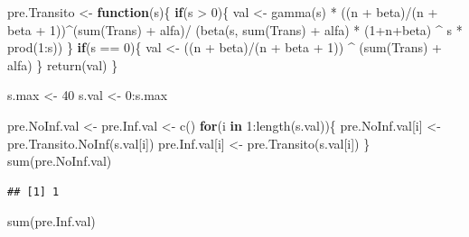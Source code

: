 \documentclass[
  10pt,
  spanish,
]{book}
\newenvironment{Shaded}{\begin{snugshade}}{\end{snugshade}}
\newcommand{\ControlFlowTok}[1]{\textcolor[rgb]{0.13,0.29,0.53}{\textbf{#1}}}
\newcommand{\DecValTok}[1]{\textcolor[rgb]{0.00,0.00,0.81}{#1}}
\newcommand{\FunctionTok}[1]{\textcolor[rgb]{0.00,0.00,0.00}{#1}}
\newcommand{\NormalTok}[1]{#1}
\newcommand{\OtherTok}[1]{\textcolor[rgb]{0.56,0.35,0.01}{#1}}
\newcommand{\SpecialCharTok}[1]{\textcolor[rgb]{0.00,0.00,0.00}{#1}}
\theoremstyle{definition}
\theoremstyle{definition}
\theoremstyle{definition}
\theoremstyle{definition}
\theoremstyle{remark}
\begin{document}
\begin{Shaded}
\begin{Highlighting}[]
\NormalTok{pre.Transito }\OtherTok{\textless{}{-}} \ControlFlowTok{function}\NormalTok{(s)\{}
  \ControlFlowTok{if}\NormalTok{(s }\SpecialCharTok{\textgreater{}} \DecValTok{0}\NormalTok{)\{}
\NormalTok{    val }\OtherTok{\textless{}{-}} \FunctionTok{gamma}\NormalTok{(s) }\SpecialCharTok{*} 
\NormalTok{      ((n }\SpecialCharTok{+}\NormalTok{ beta)}\SpecialCharTok{/}\NormalTok{(n }\SpecialCharTok{+}\NormalTok{ beta }\SpecialCharTok{+} \DecValTok{1}\NormalTok{))}\SpecialCharTok{\^{}}\NormalTok{(}\FunctionTok{sum}\NormalTok{(Trans) }\SpecialCharTok{+}\NormalTok{ alfa)}\SpecialCharTok{/}
\NormalTok{      (}\FunctionTok{beta}\NormalTok{(s, }\FunctionTok{sum}\NormalTok{(Trans) }\SpecialCharTok{+}\NormalTok{ alfa) }\SpecialCharTok{*}\NormalTok{ (}\DecValTok{1}\SpecialCharTok{+}\NormalTok{n}\SpecialCharTok{+}\NormalTok{beta) }\SpecialCharTok{\^{}}\NormalTok{ s }\SpecialCharTok{*} 
         \FunctionTok{prod}\NormalTok{(}\DecValTok{1}\SpecialCharTok{:}\NormalTok{s))}
\NormalTok{  \}}
  \ControlFlowTok{if}\NormalTok{(s }\SpecialCharTok{==} \DecValTok{0}\NormalTok{)\{}
\NormalTok{    val }\OtherTok{\textless{}{-}}\NormalTok{ ((n }\SpecialCharTok{+}\NormalTok{ beta)}\SpecialCharTok{/}\NormalTok{(n }\SpecialCharTok{+}\NormalTok{ beta }\SpecialCharTok{+} \DecValTok{1}\NormalTok{)) }\SpecialCharTok{\^{}}\NormalTok{ (}\FunctionTok{sum}\NormalTok{(Trans) }\SpecialCharTok{+}\NormalTok{ alfa)}
\NormalTok{    \}}
  \FunctionTok{return}\NormalTok{(val)}
\NormalTok{\}}

\NormalTok{s.max }\OtherTok{\textless{}{-}} \DecValTok{40} 
\NormalTok{s.val }\OtherTok{\textless{}{-}} \DecValTok{0}\SpecialCharTok{:}\NormalTok{s.max}

\NormalTok{pre.NoInf.val }\OtherTok{\textless{}{-}}\NormalTok{ pre.Inf.val }\OtherTok{\textless{}{-}} \FunctionTok{c}\NormalTok{()}
\ControlFlowTok{for}\NormalTok{(i }\ControlFlowTok{in} \DecValTok{1}\SpecialCharTok{:}\FunctionTok{length}\NormalTok{(s.val))\{}
\NormalTok{  pre.NoInf.val[i] }\OtherTok{\textless{}{-}} \FunctionTok{pre.Transito.NoInf}\NormalTok{(s.val[i])}
\NormalTok{  pre.Inf.val[i] }\OtherTok{\textless{}{-}} \FunctionTok{pre.Transito}\NormalTok{(s.val[i])}
\NormalTok{\}}
\FunctionTok{sum}\NormalTok{(pre.NoInf.val)}
\end{Highlighting}
\end{Shaded}

\begin{verbatim}
## [1] 1
\end{verbatim}

\begin{Shaded}
\begin{Highlighting}[]
\FunctionTok{sum}\NormalTok{(pre.Inf.val)}
\end{Highlighting}
\end{Shaded}
\end{document}
